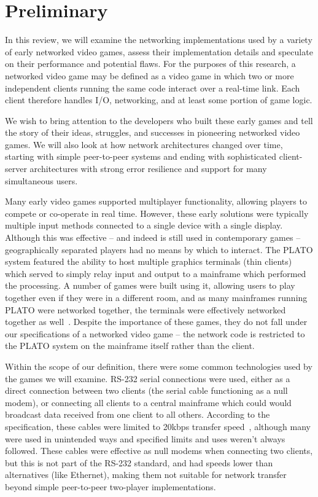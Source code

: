 \section{Preliminary}\label{sec:pre}


In this review, we will examine the networking implementations used by a variety of early networked video games, assess their implementation details and speculate on their performance and potential flaws. For the purposes of this research, a networked video game may be defined as a video game in which two or more independent clients running the same code interact over a real-time link. Each client therefore handles I/O, networking, and at least some portion of game logic.

We wish to bring attention to the developers who built these early games and tell the story of their ideas, struggles, and successes in pioneering networked video games. We will also look at how network architectures changed over time, starting with simple peer-to-peer systems and ending with sophisticated client-server architectures with strong error resilience and support for many simultaneous users.

Many early video games supported multiplayer functionality, allowing players to compete or co-operate in real time. However, these early solutions were typically multiple input methods connected to a single device with a single display. Although this was effective -- and indeed is still used in contemporary games -- geographically separated players had no means by which to interact.
The PLATO system featured the ability to host multiple graphics terminals (thin clients) which served to simply relay input and output to a mainframe which performed the processing. A number of games were built using it, allowing users to play together even if they were in a different room, and as many mainframes running PLATO were networked together, the terminals were effectively networked together as well~\cite{plato}.
Despite the importance of these games, they do not fall under our specifications of a networked video game -- the network code is restricted to the PLATO system on the mainframe itself rather than the client.

Within the scope of our definition, there were some common technologies used by the games we will examine. RS-232 serial connections were used, either as a direct connection between two clients (the serial cable functioning as a null modem), or connecting all clients to a central mainframe which could would broadcast data received from one client to all others. According to the specification, these cables were limited to 20kbps transfer speed~\cite{Buchanan2004}, although many were used in unintended ways and specified limits and uses weren't always followed. These cables were effective as null modems when connecting two clients, but this is not part of the RS-232 standard, and had speeds lower than alternatives (like Ethernet), making them not suitable for network transfer beyond simple peer-to-peer two-player implementations.

